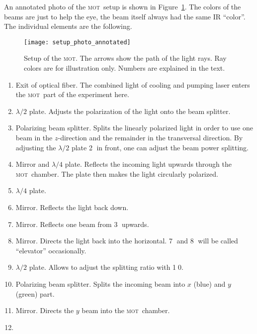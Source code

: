 \documentclass[11pt, english, fleqn, DIV=15, headinclude, BCOR=2cm]{scrreprt}
\newcommand\mot{\textsc{mot}}
\begin{document}
An annotated photo of the \mot\ setup is shown in
Figure~\ref{fig:setup_photo_annotated}. The colors of the beams are just to
help the eye, the beam itself always had the same IR \enquote{color}. The
individual elements are the following.

\begin{figure}
    \centering
    \texttt{[image: setup\_photo\_annotated]}
    \caption{%
        Setup of the \mot. The arrows show the path of the light rays. Ray
        colors are for illustration only. Numbers are explained in the text.
    }
    \label{fig:setup_photo_annotated}
\end{figure}

\begin{enumerate}
    \item
        Exit of optical fiber. The combined light of cooling and pumping
        laser enters the \mot\ part of the experiment here.
    \item
        $\lambda/2$ plate. Adjusts the polarization of the light onto the beam
        splitter.
    \item
        Polarizing beam splitter. Splits the linearly polarized light in order
        to use one beam in the $z$-direction and the remainder in the
        transversal direction. By adjusting the $\lambda/2$ plate \textcircled
        2 in front, one can adjust the beam power splitting.
    \item
        Mirror and $\lambda/4$ plate. Reflects the incoming light upwards
        through the \mot\ chamber. The plate then makes the light circularly
        polarized.
    \item
        $\lambda/4$ plate.
    \item
        Mirror. Reflects the light back down.
    \item
        Mirror. Reflects one beam from \textcircled 3 upwards.
    \item
        Mirror. Directs the light back into the horizontal. \textcircled 7 and
        \textcircled 8 will be called \enquote{elevator} occasionally.
    \item
        $\lambda/2$ plate. Allows to adjust the splitting ratio with
        \textcircled{10}.
    \item
        Polarizing beam splitter. Splits the incoming beam into $x$ (blue) and
        $y$ (green) part.
    \item
        Mirror. Directs the $y$ beam into the \mot\ chamber.
    \item

\end{enumerate}
\end{document}
